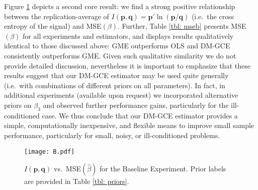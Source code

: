 \documentclass{elsarticle}
\begin{document}
Figure \ref{fig: B} depicts a second core result: we find a strong positive 
relationship between the replication-average of $I(\mathbf{p}, \mathbf{q}) = 
\mathbf{p}'\ln (\mathbf{p}/\mathbf{q})$ (i.e.\ the cross entropy of the signal) 
and MSE$(\beta)$.
Further, Table \ref{tbl: mseb} presents MSE$(\beta)$ for all experiments and 
estimators, and displays results qualitatively identical to those discussed above:
GME outperforms OLS and DM-GCE consistently outperforms GME.
Given such qualitative similarity we do not provide detailed discussion, 
nevertheless it is important to emphasize that these results suggest that our 
DM-GCE estimator may be used quite generally (i.e.\ with combinations of 
different priors on all parameters).
In fact, in additional experiments (available upon request) we incorporated 
alternative priors on $\beta_3$ and observed further performance gains,
particularly for the ill-conditioned case.
We thus conclude that our DM-GCE estimator provides a simple, 
computationally inexpensive, and flexible means to improve small sample 
performance, particularly for small, noisy, or ill-conditioned problems.

\begin{figure}[htbp]
\centering
\texttt{[image: B.pdf]}
\caption{$I(\mathbf{p}, \mathbf{q})$ vs.\ MSE$(\hat{\beta})$ for the 
Baseline Experiment. Prior labels are provided in Table \ref{tbl: priors}.}
\label{fig: B}
\end{figure}

\footnotesize
{}
\normalsize
\end{document}

